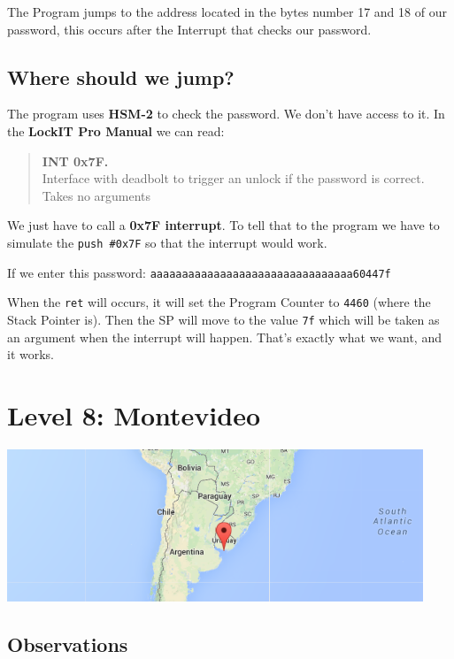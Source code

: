 \documentclass[a4paper,11pt]{article}
\begin{document}
The Program jumps to the address located in the bytes number 17 and 18
of our password, this occurs after the Interrupt that checks our
password.

\subsection{Where should we jump?}\label{where-should-we-jump}

The program uses \textbf{HSM-2} to check the password. We don't have
access to it. In the \textbf{LockIT Pro Manual} we can read:

\begin{quote}
\textbf{INT 0x7F.}\\Interface with deadbolt to trigger an unlock if the
password is correct.\\Takes no arguments
\end{quote}

We just have to call a \textbf{0x7F interrupt}. To tell that to the
program we have to simulate the \texttt{push \#0x7F} so that the
interrupt would work.

If we enter this password:
\texttt{aaaaaaaaaaaaaaaaaaaaaaaaaaaaaaaa60447f}

When the \texttt{ret} will occurs, it will set the Program Counter to
\texttt{4460} (where the Stack Pointer is). Then the SP will move to the
value \texttt{7f} which will be taken as an argument when the interrupt
will happen. That's exactly what we want, and it works.

\section{Level 8: Montevideo}\label{level-8-montevideo}

\includegraphics{img/8_1.PNG}

\subsection{Observations}\label{observations-4}
\end{document}
